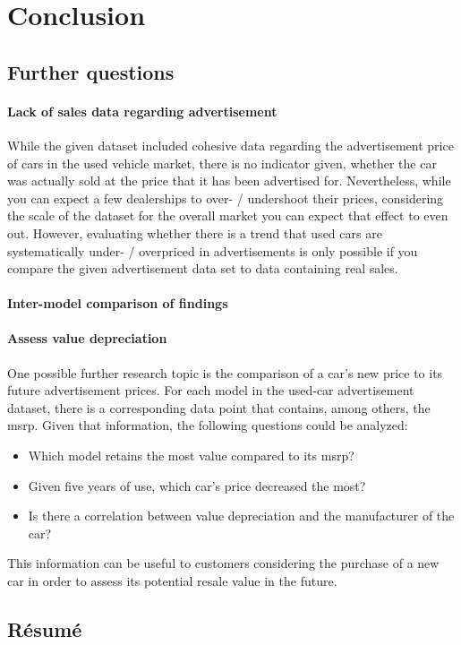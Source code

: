 \chapter{Conclusion}
\section{Further questions}


\subsubsection{Lack of sales data regarding advertisement}
While the given dataset included cohesive data regarding the advertisement price of cars in the used vehicle market,
there is no indicator given, whether the car was actually sold at the price that it has been advertised for. 
\newline
Nevertheless, while you can expect a few dealerships to over- / undershoot their prices,
considering the scale of the dataset for the overall market you can expect that effect to even out.
However, evaluating whether there is a trend that used cars are systematically under- / overpriced in advertisements
is only possible if you compare the given advertisement data set to data containing real sales. %
\subsubsection{Inter-model comparison of findings}

\subsubsection{Assess value depreciation}
One possible further research topic is the comparison of a car's new price
to its future advertisement prices. For each model in the used-car advertisement dataset, there is a corresponding data point
that contains, among others, the \ac{msrp}. 
\newline
Given that information, the following questions could be analyzed: 
\begin{itemize}
\item Which model retains the most value compared to its \ac{msrp}?
\item Given five years of use, which car's price decreased the most?
\item Is there a correlation between value depreciation and the manufacturer of the car? 
\end{itemize}
This information can be useful to customers considering the purchase of a new car in order to assess its potential resale value in the future.


\section{Résumé}
   